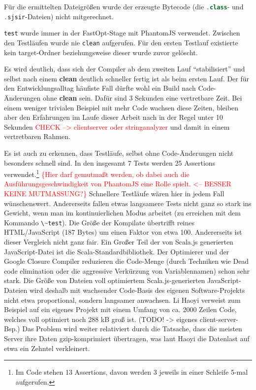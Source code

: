 \documentclass[a4paper, 12pt, hidelinks, listof=totoc, listoftables=totoc, bibliography=totoc]{scrreprt}
\newcommand{\code}[1]{\lstinline[language=Scala, style=inline]|#1|}
\newcommand{\TODO}[1]{\textcolor{red}{#1}\newline}
\newcommand{\TODOi}[1]{\textcolor{red}{\{#1\}}}
\begin{document}
\medskip

Für die ermittelten Dateigrößen wurde der erzeugte Bytecode (die \code{.class}- und \code{.sjsir}-Dateien) nicht mitgerechnet.

\code{test} wurde immer in der FastOpt-Stage mit PhantomJS verwendet. Zwischen den Testläufen wurde nie \code{clean} aufgerufen. Für den ersten Testlauf existierte kein target-Ordner beziehungsweise dieser wurde zuvor gelöscht.

Es wird deutlich, dass sich der Compiler ab dem zweiten Lauf "`stabilisiert"' und selbst nach einem \textbf{clean} deutlich schneller fertig ist als beim ersten Lauf. Der für den Entwicklungsalltag häufiste Fall dürfte wohl ein Build nach Code-Änderungen ohne \textbf{clean} sein. Dafür sind 3 Sekunden eine vertretbare Zeit. Bei einem weniger trivialen Beispiel mit mehr Code wachsen diese Zeiten, bleiben aber den Erfahrungen im Laufe dieser Arbeit nach in der Regel unter 10 Sekunden \TODO{CHECK --> clientserver oder stringanalyzer} und damit in einem vertretbaren Rahmen.

Es ist auch zu erkennen, dass Testläufe, selbst ohne Code-Änderungen nicht besonders schnell sind. In den insgesamt 7 Tests werden 25 Assertions verwendet.\footnote{Im Code stehen 13 Assertions, davon werden 3 jeweils in einer Schleife 5-mal aufgerufen.} \TODOi{Hier darf gemutmaßt werden, ob dabei auch die Ausführungsgeschwindigkeit von PhantomJS eine Rolle spielt.  <-- BESSER KEINE MUTMASSUNG?} Schnellere Testläufe wären hier in jedem Fall wünschenswert. Andererseits fallen etwas langsamere Tests nicht ganz so stark ins Gewicht, wenn man im kontinuierlichen Modus arbeitet (zu erreichen mit dem Kommando \code{\~test}).
Die Größe der Kompilate übertrifft reines HTML/JavaScript (187 Bytes) um einen Faktor von etwa 100. Andererseits ist dieser Vergleich nicht ganz fair. Ein Großer Teil der von Scala.js generierten JavaScript-Datei ist die Scala-Standardbibliothek.
Der Optimierer und der Google Closure Compiler reduzieren die Code-Menge (durch Techniken wie Dead code elimination oder die aggressive Verkürzung von Variablennamen) schon sehr stark. Die Größe von Dateien voll optimiertem Scala.js-generierten JavaScript-Dateien wird deshalb mit wachsender Code-Basis des eigenen Software-Projekts nicht etwa proportional, sondern langsamer anwachsen. Li Haoyi verweist zum Beispiel auf ein eigenes Projekt mit einem Umfang von ca. 2000 Zeilen Code, welches voll optimiert noch 288 kB groß ist. (TODO! -> eigenes client-server-Bsp.) Das Problem wird weiter relativiert durch die Tatsache, dass die meisten Server ihre Daten gzip-komprimiert übertragen, was laut Haoyi die Datenlast auf etwa ein Zehntel verkleinert.\cite[\#BlobSize]{haoyi.HOS}
\end{document}
